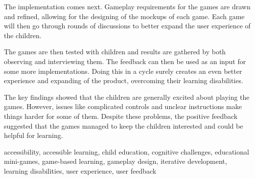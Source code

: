 The implementation comes next. Gameplay requirements for the games are drawn and refined, allowing for the designing of the mockups of each game. Each game will then go through rounds of discussions to better expand the user experience of the children.

The games are then tested with children and results are gathered by both observing and interviewing them. The feedback can then be used as an input for some more implementations. Doing this in a cycle surely creates an even better experience and expanding of the product, overcoming their learning disabilities.

The key findings showed that the children are generally excited about playing the games. However, issues like complicated controls and unclear instructions make things harder for some of them. Despite these problems, the positive feedback suggested that the games managed to keep the children interested and could be helpful for learning.


\begin{keywords}
	accessibility, accessible learning, child education, cognitive challenges, educational mini-games, game-based learning, gameplay design, iterative development, learning disabilities, user experience, user feedback
\end{keywords}
	
